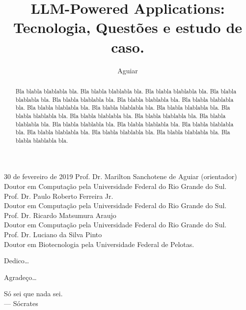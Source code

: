 \documentclass[tcc,capa]{texufpel}
\title{LLM-Powered Applications: Tecnologia, Questões e estudo de caso.}
\author{Aguiar}{Marilton Sanchotene de}
\begin{document}

\maketitle 

\sloppy

\fichacatalografica


\begin{aprovacao}{30 de fevereiro de 2019} %
\noindent Prof. Dr. Marilton Sanchotene de Aguiar (orientador)\\
Doutor em Computação pela Universidade Federal do Rio Grande do Sul.\\[1cm]

\noindent Prof. Dr. Paulo Roberto Ferreira Jr.\\
Doutor em Computação pela Universidade Federal do Rio Grande do Sul.\\[1cm]

\noindent Prof. Dr. Ricardo Matsumura Araujo\\
Doutor em Computação pela Universidade Federal do Rio Grande do Sul.\\[1cm]

\noindent Prof. Dr. Luciano da Silva Pinto\\
Doutor em Biotecnologia pela Universidade Federal de Pelotas.
\end{aprovacao}

\begin{dedicatoria}
  Dedico\ldots 
\end{dedicatoria}

\begin{agradecimentos}
  Agradeço\ldots 
\end{agradecimentos}

\begin{epigrafe}
  Só sei que nada sei.\\
  {\sc --- Sócrates}
\end{epigrafe}

\begin{abstract}
Bla blabla blablabla bla.  Bla blabla blablabla bla.  Bla blabla
blablabla bla.  Bla blabla blablabla bla.  Bla blabla blablabla bla.
Bla blabla blablabla bla.  Bla blabla blablabla bla.  Bla blabla
blablabla bla.  Bla blabla blablabla bla.  Bla blabla blablabla bla.
Bla blabla blablabla bla.  Bla blabla blablabla bla.  Bla blabla
blablabla bla.  Bla blabla blablabla bla.  Bla blabla blablabla bla.
Bla blabla blablabla bla.  Bla blabla blablabla bla.  Bla blabla
blablabla bla.  Bla blabla blablabla bla.  Bla blabla blablabla bla.
Bla blabla blablabla bla.
\end{abstract}
\end{document}
